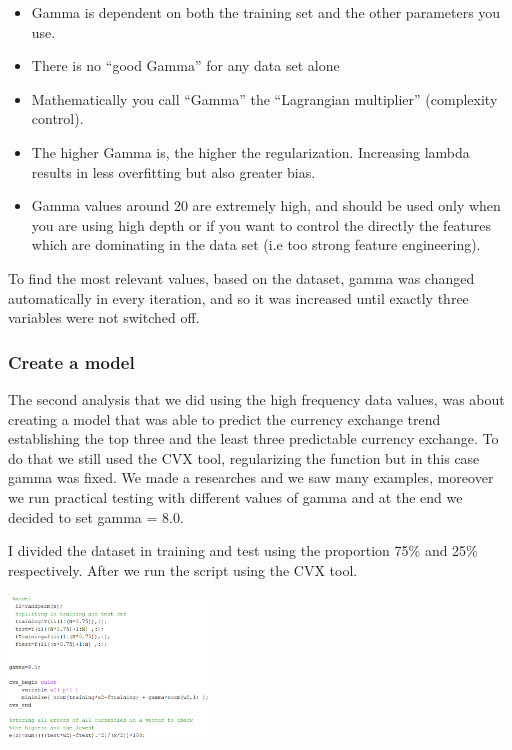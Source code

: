\documentclass[sigconf]{acmart}
\begin{document}
\begin{itemize}
\item Gamma is dependent on both the training set and the other parameters you use.
\item There is no “good Gamma” for any data set alone
\item Mathematically you call “Gamma” the “Lagrangian multiplier” (complexity control).
\item The higher Gamma is, the higher the regularization. Increasing lambda results in less overfitting but also greater bias.
\item Gamma values around 20 are extremely high, and should be used only when you are using high depth or if you want to control the directly the features which are dominating in the data set (i.e too strong feature engineering). 

\end{itemize}

To find the most relevant values, based on the dataset, gamma was changed automatically in every iteration, and so it was increased until exactly three variables were not switched off.

\subsubsection{Create a model}
The second analysis that we did using the high frequency data values, was about creating a model that was able to predict the currency exchange trend establishing the top three and the least three predictable currency exchange. To do that we still used the CVX tool, regularizing the function but in this case gamma was fixed. We made a researches and we saw many examples, moreover we run practical testing with different values of gamma and at the end we decided to set gamma = 8.0.

I divided the dataset in training and test using the proportion 75\% and 25\% respectively. After we run the script using the CVX tool. 


\includegraphics[width=0.4\textwidth]{error.png}
\end{document}

